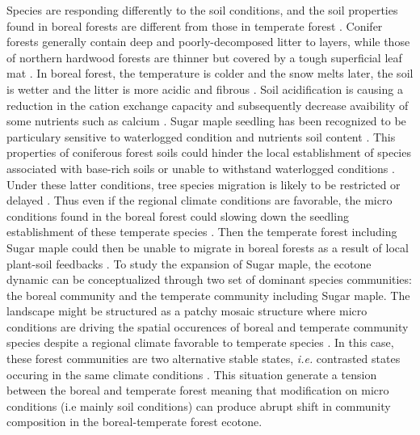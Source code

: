 Species are responding differently to the soil conditions, and the soil
properties found in boreal forests are different from those in temperate
forest \cite{Lafleur2010,Barras1998,Goldblum2010,Demers1998}. Conifer forests
generally contain deep and poorly-decomposed litter to layers, while those of
northern hardwood forests are thinner but covered by a tough superficial leaf
mat \cite{Barras1998}. In boreal forest, the temperature is colder and the
snow melts later, the soil is wetter and the litter is more acidic and fibrous
\cite{Lafleur2010,Goldblum2010}. Soil acidification is causing a reduction in
the cation exchange capacity and subsequently decrease avaibility of some
nutrients such as calcium \cite{Moore2008}. Sugar maple seedling has been
recognized to be particulary sensitive to waterlogged condition and nutrients
soil content \cite{Moore2008,Lafleur2010,Cleavitt2011}. This properties of
coniferous forest soils could hinder the local establishment of species
associated with base-rich soils or unable to withstand waterlogged conditions
\cite{Lafleur2010}. Under these latter conditions, tree species migration is
likely to be restricted or delayed \cite{Lafleur2010}. Thus even if the
regional climate conditions are favorable, the micro conditions found in the
boreal forest could slowing down the seedling establishment of these temperate
species \cite{Kellman2004,Moore2008,Barras1998,Messier2011}. Then the
temperate forest including Sugar maple could then be unable to migrate in
boreal forests as a result of local plant-soil feedbacks
\cite{McCarthyNeumann2012}. To study the expansion of Sugar maple, the ecotone
dynamic can be conceptualized through two set of dominant species communities:
the boreal community and the temperate community including Sugar maple. The
landscape might be structured as a patchy mosaic structure where micro
conditions are driving the spatial occurences of boreal and temperate
community species despite a regional climate favorable to temperate species
\cite{Goldblum2010,Fisichelli2013}. In this case, these forest communities are
two alternative stable states, \textit{i.e.} contrasted states occuring in the
same climate conditions \cite{scheffer2009critical}. This situation generate a
tension between the boreal and temperate forest meaning that modification on
micro conditions (i.e mainly soil conditions) can produce abrupt shift in
community composition in the boreal-temperate forest ecotone.\\

